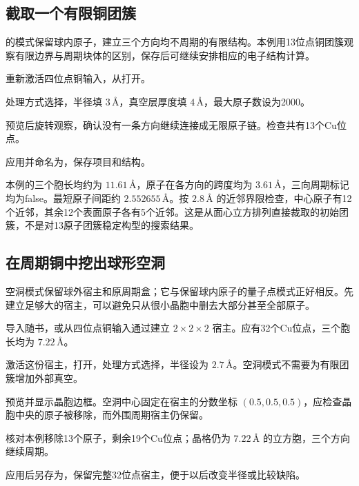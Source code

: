 \subsection{截取一个有限铜团簇}

的模式保留球内原子，建立三个方向均不周期的有限结构。本例用13位点铜团簇观察有限边界与周期块体的区别，保存后可继续安排相应的电子结构计算。

\begin{steps}
  \item 重新激活四位点铜输入，从打开。
  \item 处理方式选择，半径填 $3\,\text{\AA}$，真空层厚度填 $4\,\text{\AA}$，最大原子数设为2000。
  \item 预览后旋转观察，确认没有一条方向继续连接成无限原子链。检查共有13个Cu位点。
  \item 应用并命名为，保存项目和结构。
\end{steps}

本例的三个胞长均约为 $11.61\,\text{\AA}$，原子在各方向的跨度均为 $3.61\,\text{\AA}$，三向周期标记均为false。最短原子间距约 $2.552655\,\text{\AA}$。按 $2.8\,\text{\AA}$ 的近邻界限检查，中心原子有12个近邻，其余12个表面原子各有5个近邻。这是从面心立方排列直接裁取的初始团簇，不是对13原子团簇稳定构型的搜索结果。

\subsection{在周期铜中挖出球形空洞}

空洞模式保留球外宿主和原周期盒；它与保留球内原子的量子点模式正好相反。先建立足够大的宿主，可以避免只从很小晶胞中删去大部分甚至全部原子。

\begin{steps}
  \item 导入随书，或从四位点铜输入通过建立 $2\times2\times2$ 宿主。应有32个Cu位点，三个胞长均为 $7.22\,\text{\AA}$。
  \item 激活这份宿主，打开，处理方式选择，半径设为 $2.7\,\text{\AA}$。空洞模式不需要为有限团簇增加外部真空。
  \item 预览并显示晶胞边框。空洞中心固定在宿主的分数坐标 \((0.5,0.5,0.5)\)，应检查晶胞中央的原子被移除，而外围周期宿主仍保留。
  \item 核对本例移除13个原子，剩余19个Cu位点；晶格仍为 $7.22\,\text{\AA}$ 的立方胞，三个方向继续周期。
  \item 应用后另存为，保留完整32位点宿主，便于以后改变半径或比较缺陷。
\end{steps}


